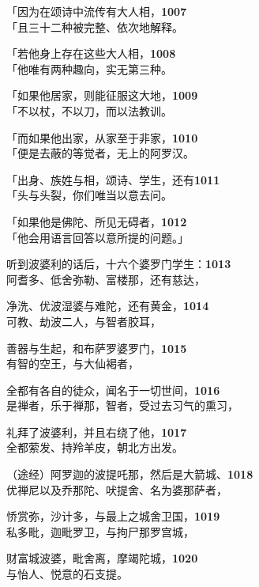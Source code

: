 「因为在颂诗中流传有大人相，\hfill{\grayfootnotesize \textbf{1007}} \\
「且三十二种被完整、依次地解释。


「若他身上存在这些大人相，\hfill{\grayfootnotesize \textbf{1008}} \\
「他唯有两种趣向，实无第三种。

「如果他居家，则能征服这大地，\hfill{\grayfootnotesize \textbf{1009}} \\
「不以杖，不以刀，而以法教训。

「而如果他出家，从家至于非家，\hfill{\grayfootnotesize \textbf{1010}} \\
「便是去蔽的等觉者，无上的阿罗汉。

「出身、族姓与相，颂诗、学生，还有\hfill{\grayfootnotesize \textbf{1011}} \\
「头与头裂，你们唯当以意去问。


「如果他是佛陀、所见无碍者，\hfill{\grayfootnotesize \textbf{1012}} \\
「他会用语言回答以意所提的问题。」

听到波婆利的话后，十六个婆罗门学生：\hfill{\grayfootnotesize \textbf{1013}} \\
阿耆多、低舍弥勒、富楼那，还有慈达，


净洗、优波湿婆与难陀，还有黄金，\hfill{\grayfootnotesize \textbf{1014}} \\
可教、劫波二人，与智者胶耳，

善器与生起，和布萨罗婆罗门，\hfill{\grayfootnotesize \textbf{1015}} \\
有智的空王，与大仙褐者，

全都有各自的徒众，闻名于一切世间，\hfill{\grayfootnotesize \textbf{1016}} \\
是禅者，乐于禅那，智者，受过去习气的熏习，


礼拜了波婆利，并且右绕了他，\hfill{\grayfootnotesize \textbf{1017}} \\
全都萦发、持羚羊皮，朝北方出发。

（途经）阿罗迦的波提吒那，然后是大箭城、\hfill{\grayfootnotesize \textbf{1018}} \\
优禅尼以及乔那陀、吠提舍、名为婆那萨者，


㤭赏弥，沙计多，与最上之城舍卫国，\hfill{\grayfootnotesize \textbf{1019}} \\
私多毗，迦毗罗卫，与拘尸那罗宫城，


财富城波婆，毗舍离，摩竭陀城，\hfill{\grayfootnotesize \textbf{1020}} \\
与怡人、悦意的石支提。



